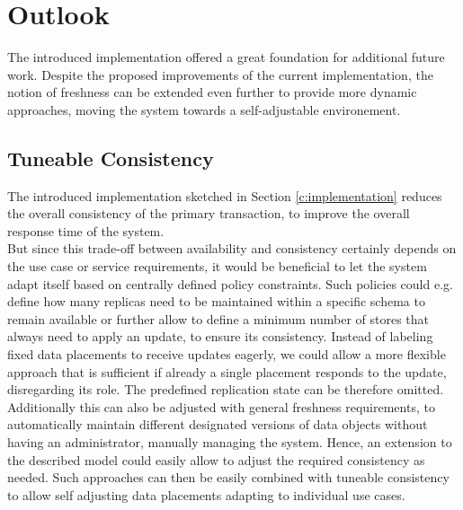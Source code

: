 \chapter{Outlook}
\label{c:outlook}

The introduced implementation offered a great foundation for additional future work.
Despite the proposed improvements of the current implementation, the notion of freshness can be extended even further to provide more dynamic approaches,
moving the system towards a self-adjustable environement.




\tocless\section{Tuneable Consistency}
The introduced implementation sketched in Section \ref{c:implementation} reduces the overall consistency of the primary transaction,
to improve the overall response time of the system.\\ 
But since this trade-off between availability and consistency certainly depends on the use case or service requirements, it would be beneficial
to let the system adapt itself based on centrally defined policy constraints. Such policies could e.g. define how many replicas need to be maintained within a specific 
schema to remain available or further allow to define a minimum number of stores that always need to apply an update, to ensure its consistency.
Instead of labeling fixed data placements to receive updates eagerly, we could allow a more flexible approach that is sufficient if already a single placement 
responds to the update, disregarding its role. 
The predefined replication state can be therefore omitted. 
Additionally this can also be adjusted with general freshness requirements, to automatically maintain different designated versions of data objects 
without having an administrator, manually managing the system.
Hence, an extension to the described model could easily allow to adjust the required consistency as needed.
Such approaches can then be easily combined with tuneable consistency to allow self adjusting data placements adapting to individual use cases.\\



